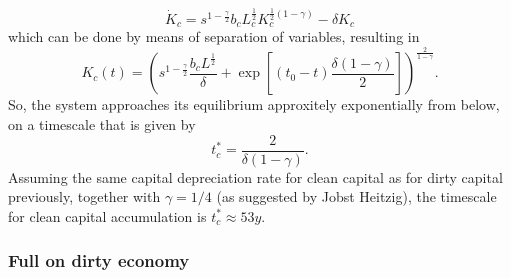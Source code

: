 \begin{equation}
	\dot{K}_c = s^{1-\frac{\gamma}{2}} b_c L_c^{\frac{1}{2}}K_c^{\frac{1}{2}(1-\gamma)} - \delta K_c
	\label{eq:learning_trajectory_ode}
\end{equation}
which can be done by means of separation of variables, resulting in
\begin{equation}
  K_c(t) = \left( s^{1-\frac{\gamma}{2}}\frac{b_c L^{\frac{1}{2}}}{\delta} + \exp\left[ (t_0-t) \frac{\delta (1-\gamma)}{2} \right] \right)^{\frac{2}{1-\gamma}}.
	\label{eq:learning_trajectory_solution}
\end{equation}
So, the system approaches its equilibrium approxitely exponentially from below, on a timescale that is given by
\begin{equation}
	t_c^* = \frac{2}{\delta(1-\gamma)}
	\label{eq_learning_equilibrium_timescale}.
\end{equation}
Assuming the same capital depreciation rate for clean capital as for dirty capital previously, together with $\gamma = 1/4$ (as suggested by Jobst Heitzig), the timescale for clean capital accumulation is $t^*_c \approx 53 y$.

\subsubsection{Full on dirty economy}
\label{sec:full_dirty_economy}

